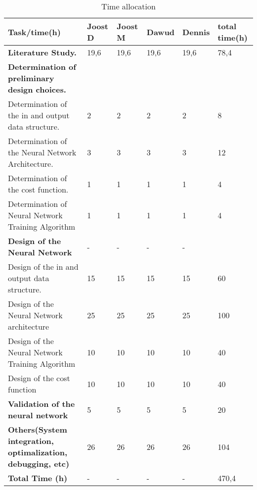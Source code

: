 \begin{sidewaystable}[h!]
	\centering
	\caption{Time allocation}
	\label{tab:timeallocation}
	\begin{tabular}{|l|llll|l|} \hline
		Task/time(h)                                               & Joost D & Joost M & Dawud & Dennis & total time(h) \\ \hline
		\textbf{Literature Study.}                                           & 19,6    & 19,6    & 19,6  & 19,6   & 78,4          \\
		\textbf{Determination of preliminary design choices.}               &         &         &       &        &               \\
		Determination of the in and output data structure.         & 2       & 2       & 2     & 2      & 8             \\
		Determination of the Neural Network Architecture.          & 3       & 3       & 3     & 3      & 12            \\
		Determination of the cost function.                        & 1       & 1       & 1     & 1      & 4             \\
		Determination of Neural Network Training Algorithm         & 1       & 1       & 1     & 1      & 4             \\
		\textbf{Design of the Neural Network}                      &     -    &  -       &    -   & - 		    &               \\
		Design of the in and output data structure.                & 15      & 15      & 15    & 15     & 60            \\
		Design of the Neural Network architecture                  & 25      & 25      & 25    & 25     & 100           \\
		Design of the Neural Network Training Algorithm            & 10      & 10      & 10    & 10     & 40            \\
		Design of the cost function                                & 10      & 10      & 10    & 10     & 40            \\
		\textbf{Validation of the neural network}                  & 5       & 5       & 5     & 5      & 20            \\
		\textbf{Others(System integration, optimalization, debugging, etc)} & 26      & 26      & 26    & 26     & 104           \\
		\textbf{Total Time (h)}                                              &   -      &    -     &   -    &   -     & 470,4       \\ \hline
	\end{tabular}
\end{sidewaystable}

